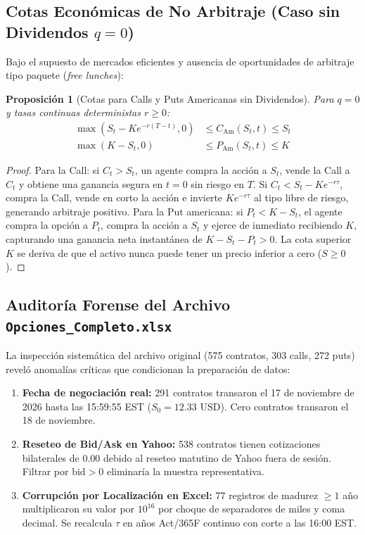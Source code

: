 \documentclass[11pt,a4paper]{article}
\newtheorem{proposition}[theorem]{Proposición}
\begin{document}
\subsection{Cotas Económicas de No Arbitraje (Caso sin Dividendos $q = 0$)}
Bajo el supuesto de mercados eficientes y ausencia de oportunidades de arbitraje tipo paquete (\textit{free lunches}):
\begin{proposition}[Cotas para Calls y Puts Americanas sin Dividendos]
Para $q = 0$ y tasas continuas deterministas $r \ge 0$:
\begin{align}
    \max(S_t - K e^{-r(T-t)}, 0) &\le C_{\text{Am}}(S_t, t) \le S_t \\
    \max(K - S_t, 0) &\le P_{\text{Am}}(S_t, t) \le K
\end{align}
\end{proposition}
\begin{proof}
Para la Call: si $C_t > S_t$, un agente compra la acción a $S_t$, vende la Call a $C_t$ y obtiene una ganancia segura en $t=0$ sin riesgo en $T$. Si $C_t < S_t - K e^{-r\tau}$, compra la Call, vende en corto la acción e invierte $K e^{-r\tau}$ al tipo libre de riesgo, generando arbitraje positivo.
Para la Put americana: si $P_t < K - S_t$, el agente compra la opción a $P_t$, compra la acción a $S_t$ y ejerce de inmediato recibiendo $K$, capturando una ganancia neta instantánea de $K - S_t - P_t > 0$. La cota superior $K$ se deriva de que el activo nunca puede tener un precio inferior a cero ($S \ge 0$).
\end{proof}

\subsection{Auditoría Forense del Archivo \texttt{Opciones\_Completo.xlsx}}
La inspección sistemática del archivo original (575 contratos, 303 calls, 272 puts) reveló anomalías críticas que condicionan la preparación de datos:
\begin{enumerate}
    \item \textbf{Fecha de negociación real:} 291 contratos transaron el 17 de noviembre de 2026 hasta las 15:59:55 EST ($S_0 = 12.33$ USD). Cero contratos transaron el 18 de noviembre.
    \item \textbf{Reseteo de Bid/Ask en Yahoo:} 538 contratos tienen cotizaciones bilaterales de 0.00 debido al reseteo matutino de Yahoo fuera de sesión. Filtrar por $\text{bid} > 0$ eliminaría la muestra representativa.
    \item \textbf{Corrupción por Localización en Excel:} 77 registros de madurez $\ge 1$ año multiplicaron su valor por $10^{16}$ por choque de separadores de miles y coma decimal. Se recalcula $\tau$ en años Act/365F continuo con corte a las 16:00 EST.
\end{enumerate}
\end{document}
